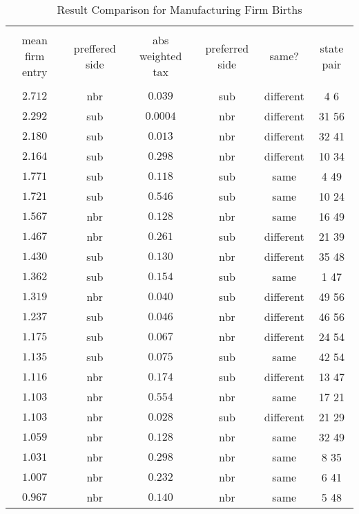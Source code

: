 
\begin{table}[!htbp] \centering 
  \caption{Result Comparison for Manufacturing Firm Births} 
  \label{} 
\small 
\begin{tabular}{@{\extracolsep{5pt}} cccccc} 
\\[-1.8ex]\hline 
\hline \\[-1.8ex] 
mean firm entry & preffered side & abs weighted tax & preferred side & same? & state pair \\ 
\hline \\[-1.8ex] 
$2.712$ & nbr & $0.039$ & sub & different & 4 6  \\ 
$2.292$ & sub & $0.0004$ & nbr & different & 31 56  \\ 
$2.180$ & sub & $0.013$ & nbr & different & 32 41  \\ 
$2.164$ & sub & $0.298$ & nbr & different & 10 34  \\ 
$1.771$ & sub & $0.118$ & sub & same & 4 49  \\ 
$1.721$ & sub & $0.546$ & sub & same & 10 24  \\ 
$1.567$ & nbr & $0.128$ & nbr & same & 16 49  \\ 
$1.467$ & nbr & $0.261$ & sub & different & 21 39  \\ 
$1.430$ & sub & $0.130$ & nbr & different & 35 48  \\ 
$1.362$ & sub & $0.154$ & sub & same & 1 47  \\ 
$1.319$ & nbr & $0.040$ & sub & different & 49 56  \\ 
$1.237$ & sub & $0.046$ & nbr & different & 46 56  \\ 
$1.175$ & sub & $0.067$ & nbr & different & 24 54  \\ 
$1.135$ & sub & $0.075$ & sub & same & 42 54  \\ 
$1.116$ & nbr & $0.174$ & sub & different & 13 47  \\ 
$1.103$ & nbr & $0.554$ & nbr & same & 17 21  \\ 
$1.103$ & nbr & $0.028$ & sub & different & 21 29  \\ 
$1.059$ & nbr & $0.128$ & nbr & same & 32 49  \\ 
$1.031$ & nbr & $0.298$ & nbr & same & 8 35  \\ 
$1.007$ & nbr & $0.232$ & nbr & same & 6 41  \\ 
$0.967$ & nbr & $0.140$ & nbr & same & 5 48  \\ 

\end{tabular}
\end{table}
